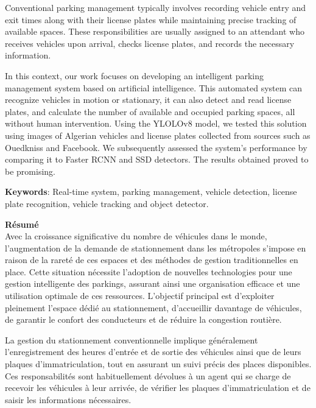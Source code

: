 Conventional parking management typically involves recording vehicle entry and exit times along with their license plates while maintaining precise tracking of available spaces. These responsibilities are usually assigned to an attendant who receives vehicles upon arrival, checks license plates, and records the necessary information.

In this context, our work focuses on developing an intelligent parking management system based on artificial intelligence. This automated system can recognize vehicles in motion or stationary, it can also detect and read license plates, and calculate the number of available and occupied parking spaces, all without human intervention. Using the YLOLOv8 model, we tested this solution using images of Algerian vehicles and license plates collected from sources such as Ouedkniss and Facebook. We subsequently assessed the system's performance by comparing it to Faster RCNN and SSD detectors. The results obtained proved to be promising.


\textbf{Keywords}: Real-time system, parking management, vehicle detection, license plate recognition, vehicle tracking and object detector.

\vspace{0.5cm}

\par
\textbf{\Large{Résumé}}\\

Avec la croissance significative du nombre de véhicules dans le monde, l'augmentation de la demande de stationnement dans les métropoles s'impose en raison de la rareté de ces espaces et des méthodes de gestion traditionnelles en place. Cette situation nécessite l'adoption de nouvelles technologies pour une gestion intelligente des parkings, assurant ainsi une organisation efficace et une utilisation optimale de ces ressources. L'objectif principal est d'exploiter pleinement l'espace dédié au stationnement, d'accueillir davantage de véhicules, de garantir le confort des conducteurs et de réduire la congestion routière.
\par

La gestion du stationnement conventionnelle implique généralement l'enregistrement des heures d'entrée et de sortie des véhicules ainsi que de leurs plaques d'immatriculation, tout en assurant un suivi précis des places disponibles. Ces responsabilités sont habituellement dévolues à un agent qui se charge de recevoir les véhicules à leur arrivée, de vérifier les plaques d'immatriculation et de saisir les informations nécessaires.

